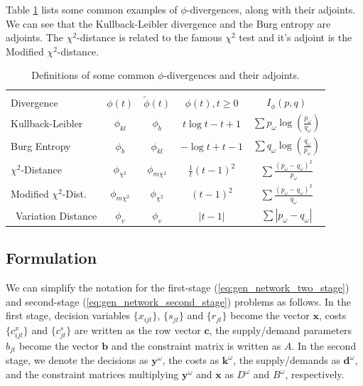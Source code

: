 \documentclass[11pt]{article}
\newcommand{\x}{\mathbf{x}}
\newcommand{\y}{\mathbf{y}}
\renewcommand{\c}{\mathbf{c}}
\renewcommand{\b}{\mathbf{b}}
\renewcommand{\k}{\mathbf{k}}
\renewcommand{\d}{\mathbf{d}}
\theoremstyle{plain}
\theoremstyle{definition}
\theoremstyle{remark}
\begin{document}
Table \ref{tb:phi_definitions_water} lists some common examples of $\phi$-divergences, along with their adjoints.
We can see that the Kullback-Leibler divergence and the Burg entropy are adjoints.
The $\chi^2$-distance is related to the famous $\chi^2$ test \citep{pardo2005statistical} and it's adjoint is the Modified $\chi^2$-distance.

\begin{table}
	\centering
	\begin{tabular}{lcccc}
		\hline \\
		Divergence                        & $\phi(t)$          & $\tilde{\phi}(t)$               & $\phi(t), t \geq 0$   & $I_\phi(p,q)$ \\
		\hline
		Kullback-Leibler                 & $\phi_{kl}$        & $\phi_b$                        & $t\log t - t + 1$     & $\sum p_\omega \log\left(\frac{p_\omega}{q_\omega}\right)$ \\
		Burg Entropy                      & $\phi_b$           & $\phi_{kl}$                     & $-\log t + t - 1$     & $\sum q_\omega \log\left(\frac{q_\omega}{p_\omega}\right)$ \\
		$\chi^2$-Distance                 & $\phi_{\chi^2}$    & $\phi_{m\chi^2}$                & $\frac{1}{t} (t-1)^2$ & $\sum \frac{(p_\omega-q_\omega)^2}{p_\omega}$ \\
		Modified $\chi^2$-Dist.           & $\phi_{m\chi^2}$   & $\phi_{\chi^2}$                 & $(t-1)^2$             & $\sum \frac{(p_\omega - q_\omega)^2}{q_\omega}$ \\\
		Variation Distance                & $\phi_v$           & $\phi_v$                        & $|t-1|$               & $\sum |p_\omega - q_\omega|$ \\
	\hline
	\end{tabular}
	\caption{
		Definitions of some common $\phi$-divergences and their adjoints.
	}
	\label{tb:phi_definitions_water}
\end{table}

\subsection{Formulation}
\label{ssec:form_water}

We can simplify the notation for the first-stage (\ref{eq:gen_network_two_stage}) and second-stage (\ref{eq:gen_network_second_stage}) problems as follows.
In the first stage, decision variables $\{x_{ijt}\}$, $\{s_{jt}\}$ and $\{r_{jt}\}$ become the vector $\x$, costs $\{c_{ijt}^x\}$ and $\{c_{jt}^s\}$ are written as the row vector $\c$, the supply/demand parameters $b_{jt}$ become the vector $\b$ and the constraint matrix is written as $A$.
In the second stage, we denote the decisions as $\y^\omega$, the costs as $\k^\omega$, the supply/demands as $\d^\omega$, and the constraint matrices multiplying $\y^\omega$ and $\x$ as $D^\omega$ and $B^\omega$, respectively.
\end{document}
